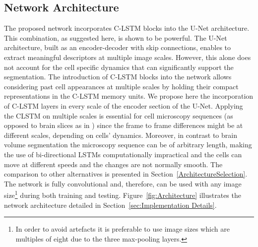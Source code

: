 \documentclass{article}
\begin{document}
\subsection{Network Architecture}\label{subsec:Network-Architecture} 
The proposed network incorporates C-LSTM \cite{xingjian15convLSTM} blocks into the U-Net \cite{Ronneberger15} architecture. This combination, as suggested here, is shown to be powerful. The U-Net architecture, built as an encoder-decoder with skip connections, enables to extract meaningful descriptors at multiple image scales. However, this alone does not account for the cell specific dynamics that can significantly support the segmentation. The introduction of C-LSTM blocks into the network allows considering past cell appearances at multiple scales by holding their compact representations in the C-LSTM memory units.
We propose here the incorporation of C-LSTM layers in every scale of the encoder section of the U-Net. Applying the CLSTM on multiple scales is essential for cell microscopy sequences (as opposed to brain slices as in \cite{chen2016combining}) since the frame to frame differences might be at different scales, depending on cells' dynamics. Moreover, in contrast to brain volume segmentation \cite{chen2016combining} the microscopy sequence can be of arbitrary length, making the use of bi-directional LSTMs computationally impractical and the cells can move at different speeds and the changes are not normally smooth. 
The comparison to other alternatives is presented in Section~\ref{ArchitectureSelection}. 
The network is fully convolutional and, therefore, can be used with any image size\footnote{In order to avoid artefacts it is preferable to use image sizes which are multiples of eight due to the three max-pooling layers.} during both training and testing. Figure~\ref{fig:Architecture} illustrates the network architecture detailed in Section~\ref{sec:Implementation Details}.
\end{document}
